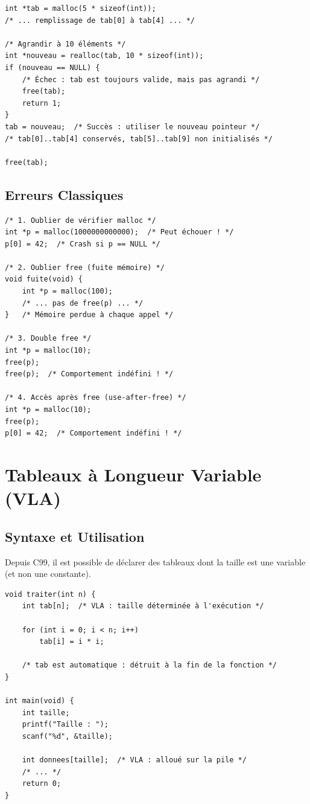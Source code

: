 \documentclass[10pt,a4paper]{article}
\begin{document}
\begin{lstlisting}
int *tab = malloc(5 * sizeof(int));
/* ... remplissage de tab[0] à tab[4] ... */

/* Agrandir à 10 éléments */
int *nouveau = realloc(tab, 10 * sizeof(int));
if (nouveau == NULL) {
    /* Échec : tab est toujours valide, mais pas agrandi */
    free(tab);
    return 1;
}
tab = nouveau;  /* Succès : utiliser le nouveau pointeur */
/* tab[0]..tab[4] conservés, tab[5]..tab[9] non initialisés */

free(tab);
\end{lstlisting}

\subsection{Erreurs Classiques}

\begin{lstlisting}
/* 1. Oublier de vérifier malloc */
int *p = malloc(1000000000000);  /* Peut échouer ! */
p[0] = 42;  /* Crash si p == NULL */

/* 2. Oublier free (fuite mémoire) */
void fuite(void) {
    int *p = malloc(100);
    /* ... pas de free(p) ... */
}   /* Mémoire perdue à chaque appel */

/* 3. Double free */
int *p = malloc(10);
free(p);
free(p);  /* Comportement indéfini ! */

/* 4. Accès après free (use-after-free) */
int *p = malloc(10);
free(p);
p[0] = 42;  /* Comportement indéfini ! */
\end{lstlisting}

\section{Tableaux à Longueur Variable (VLA)}

\subsection{Syntaxe et Utilisation}

Depuis C99, il est possible de déclarer des tableaux dont la taille est une variable (et non une constante).

\begin{lstlisting}
void traiter(int n) {
    int tab[n];  /* VLA : taille déterminée à l'exécution */
    
    for (int i = 0; i < n; i++)
        tab[i] = i * i;
    
    /* tab est automatique : détruit à la fin de la fonction */
}

int main(void) {
    int taille;
    printf("Taille : ");
    scanf("%d", &taille);
    
    int donnees[taille];  /* VLA : alloué sur la pile */
    /* ... */
    return 0;
}
\end{lstlisting}
\end{document}

